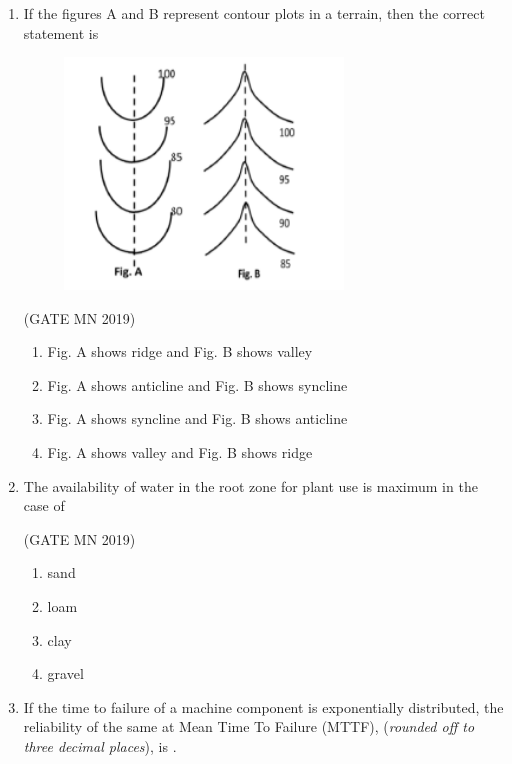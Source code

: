 \documentclass[journal]{IEEEtran}
\begin{document}
\begin{enumerate}
\item If the figures A and B represent contour plots in a terrain, then the correct statement is
\begin{figure}[H]
    \centering
	\includegraphics[width=0.7\textwidth]{Screenshot_2025_0818_132033.png}
	    \caption{}
    \label{fig:Q27}
    \end{figure}


    \hfill(GATE MN 2019)
\begin{enumerate}
\item Fig. A shows ridge and Fig. B shows valley
\item Fig. A shows anticline and Fig. B shows syncline
\item Fig. A shows syncline and Fig. B shows anticline
\item Fig. A shows valley and Fig. B shows ridge
\end{enumerate}


\item The availability of water in the root zone for plant use is maximum in the case of

	\hfill(GATE MN 2019)
\begin{multicols}{4}
\begin{enumerate}
\item sand
\item loam
\item clay
\item gravel
\end{enumerate}
\end{multicols}

  \item If the time to failure of a machine component is exponentially distributed, the reliability of the same at Mean Time To Failure (MTTF), (\textit{rounded off to three decimal places}), is \underline{\hspace{2cm}}.


\end{enumerate}
\end{document}
